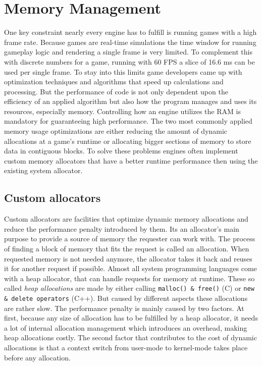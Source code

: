 \section{Memory Management} \label{mem_theory}

One key constraint nearly every engine has to fulfill is running games with a high frame rate. Because games are real-time simulations the time window for running gameplay logic and rendering a single frame is very limited. To complement this with discrete numbers for a game, running with 60 \ac{FPS} a slice of 16.6 ms can be used per single frame. To stay into this limits game developers came up with optimization techniques and algorithms that speed up calculations and processing. But the performance of code is not only dependent upon the efficiency of an applied algorithm but also how the program manages and uses its resources, especially memory. Controlling how an engine utilizes the \ac{RAM} is mandatory for guaranteeing high performance. The two most commonly applied memory usage optimizations are either reducing the amount of dynamic allocations at a game's runtime or allocating bigger sections of memory to store data in contiguous blocks. To solve these problems engines often implement custom memory allocators that have a better runtime performance then using the existing system allocator.

\subsection{Custom allocators}

Custom allocators are facilities that optimize dynamic memory allocations and reduce the performance penalty introduced by them. Its an allocator's main purpose to provide a source of memory the requester can work with. The process of finding a block of memory that fits the request is called an allocation. When requested memory is not needed anymore, the allocator takes it back and reuses it for another request if possible.
Almost all system programming languages come with a heap allocator, that can handle requests for memory at runtime. These so called \textit{heap allocations} are made by either calling \texttt{malloc() \& free()} (C) or \texttt{new \& delete operators} (C++). But caused by different aspects these allocations are rather slow. The performance penalty is mainly caused by two factors. At first, because any size of allocation has to be fulfilled by a heap allocator, it needs a lot of internal allocation management which introduces an overhead, making heap allocations costly. The second factor that contributes to the cost of dynamic allocations is that a context switch from user-mode to kernel-mode takes place before any allocation. 

